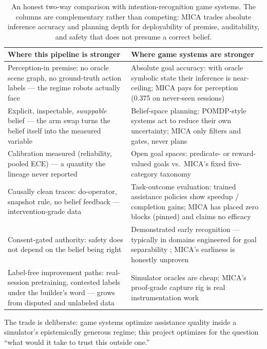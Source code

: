 \documentclass[11pt]{article}
\begin{document}
\begin{table}[ht]
\centering\small
\begin{tabular}{p{}p{}}
\toprule
\textbf{Where this pipeline is stronger} & \textbf{Where game systems are stronger} \\
\midrule
Perception-in premise: no oracle scene graph, no ground-truth action labels
--- the regime robots actually face &
Absolute goal accuracy: with oracle symbolic state their inference is
near-ceiling; MICA pays for perception (0.375 on never-seen sessions) \\
\addlinespace
Explicit, inspectable, \emph{swappable} belief --- the arm swap turns the
belief itself into the measured variable &
Belief-space planning: POMDP-style systems act to reduce their own
uncertainty; MICA only filters and gates, never plans \\
\addlinespace
Calibration measured (reliability, pooled ECE) --- a quantity the lineage
never reported &
Open goal spaces: predicate- or reward-valued goals vs.\ MICA's fixed
five-category taxonomy \\
\addlinespace
Causally clean traces: do-operator, snapshot rule, no belief feedback ---
intervention-grade data &
Task-outcome evaluation: trained assistance policies show speedup /
completion gains; MICA has placed zero blocks (pinned) and claims no
efficacy \\
\addlinespace
Consent-gated authority: safety does not depend on the belief being right &
Demonstrated early recognition --- typically in domains engineered for goal
separability \cite{grdsurvey}; MICA's earliness is honestly unproven \\
\addlinespace
Label-free improvement paths: real-session pretraining, contested labels
under the builder's word --- grows from disputed and unlabeled data &
Simulator oracles are cheap; MICA's proof-grade capture rig is real
instrumentation work \\
\bottomrule
\end{tabular}
\caption{An honest two-way comparison with intention-recognition game
systems. The columns are complementary rather than competing: MICA trades
absolute inference accuracy and planning depth for deployability of premise,
auditability, and safety that does not presume a correct belief.}
\label{tab:compare}
\end{table}

The trade is deliberate: game systems optimize assistance quality inside a
simulator's epistemically generous regime; this project optimizes for the
question ``what would it take to trust this outside one.''
\end{document}
